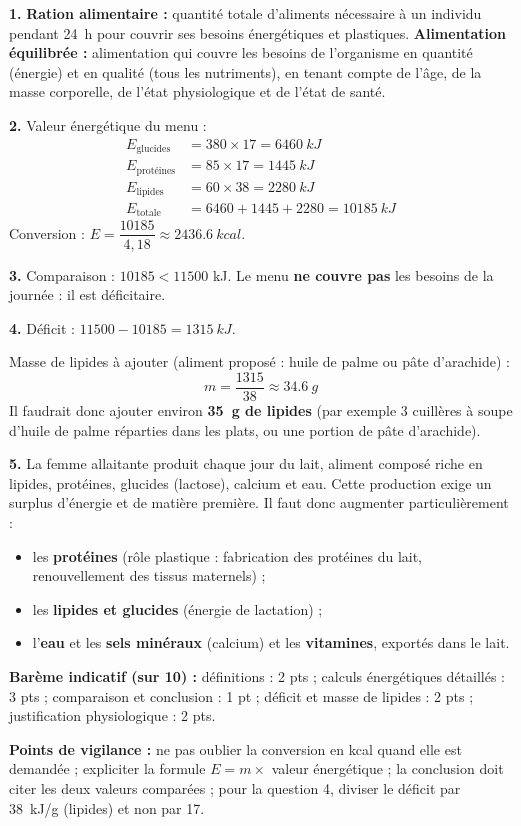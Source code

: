 \documentclass[11pt]{article}
\begin{document}
\begin{corrige}
\textbf{1.} \textbf{Ration alimentaire :} quantité totale d'aliments nécessaire à un individu pendant \SI{24}{h} pour couvrir ses besoins énergétiques et plastiques. \textbf{Alimentation équilibrée :} alimentation qui couvre les besoins de l'organisme en quantité (énergie) et en qualité (tous les nutriments), en tenant compte de l'âge, de la masse corporelle, de l'état physiologique et de l'état de santé.

\textbf{2.} Valeur énergétique du menu :
\begin{align*}
E_{\text{glucides}} &= 380 \times 17 = \SI{6460}{kJ}\\
E_{\text{protéines}} &= 85 \times 17 = \SI{1445}{kJ}\\
E_{\text{lipides}} &= 60 \times 38 = \SI{2280}{kJ}\\
E_{\text{totale}} &= 6460 + 1445 + 2280 = \SI{10185}{kJ}
\end{align*}
Conversion : $E = \dfrac{10185}{4{,}18} \approx \SI{2436,6}{kcal}$.

\textbf{3.} Comparaison : $10185 < 11500$ kJ. Le menu \textbf{ne couvre pas} les besoins de la journée : il est déficitaire.

\textbf{4.} Déficit : $11500 - 10185 = \SI{1315}{kJ}$.

Masse de lipides à ajouter (aliment proposé : huile de palme ou pâte d'arachide) :
\[m = \dfrac{1315}{38} \approx \SI{34,6}{g}\]
Il faudrait donc ajouter environ \textbf{\SI{35}{g} de lipides} (par exemple 3 cuillères à soupe d'huile de palme réparties dans les plats, ou une portion de pâte d'arachide).

\textbf{5.} La femme allaitante produit chaque jour du lait, aliment composé riche en lipides, protéines, glucides (lactose), calcium et eau. Cette production exige un surplus d'énergie et de matière première. Il faut donc augmenter particulièrement :
\begin{itemize}
\item les \textbf{protéines} (rôle plastique : fabrication des protéines du lait, renouvellement des tissus maternels) ;
\item les \textbf{lipides et glucides} (énergie de lactation) ;
\item l'\textbf{eau} et les \textbf{sels minéraux} (calcium) et les \textbf{vitamines}, exportés dans le lait.
\end{itemize}

\textbf{Barème indicatif (sur 10) :} définitions : 2 pts ; calculs énergétiques détaillés : 3 pts ; comparaison et conclusion : 1 pt ; déficit et masse de lipides : 2 pts ; justification physiologique : 2 pts.

\textbf{Points de vigilance :} ne pas oublier la conversion en kcal quand elle est demandée ; expliciter la formule $E = m \times$ valeur énergétique ; la conclusion doit citer les deux valeurs comparées ; pour la question 4, diviser le déficit par \SI{38}{kJ/g} (lipides) et non par 17.
\end{corrige}
\end{document}
